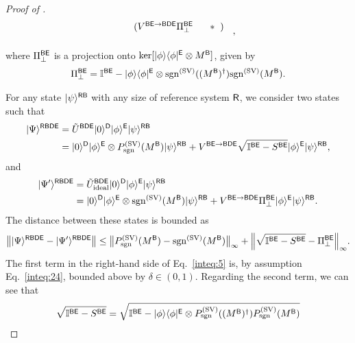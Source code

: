 \begin{proof}[Proof of ]
\begin{align}
\begin{blockarray}{ccc}
\begin{block}{c(cc)}
  &  V^{\sB\sE \rarr \sB\sD\sE}\Pi_\perp^{\sB\sE} &\hspace*{2mm} * \hspace*{2mm}\\
\end{block}
\end{blockarray}\hspace{2.5mm},
\end{align}
where $\Pi_\perp^{{\mathsf{B}}{\mathsf{E}}}$ is a projection onto $\ker[|\phi\rangle\langle\phi|^{\mathsf{E}}\otimes M^{\mathsf{B}}]$, given by 
\begin{align}
    \Pi_\perp^{{\mathsf{B}}{\mathsf{E}}} = \mathbb{I}^{{\mathsf{B}}{\mathsf{E}}} - |\phi\rangle\langle\phi|^{\mathsf{E}}\otimes \mathrm{sgn}^{(\rm SV)}((M^{\mathsf{B}})^\dag) \mathrm{sgn}^{(\rm SV)}(M^{\mathsf{B}}).
\end{align}

For any state $|\psi\rangle^{{\mathsf{R}}{\mathsf{B}}}$ with any size of reference system ${\mathsf{R}}$, we consider two states such that
\begin{align}
    |\Psi\rangle^{{\mathsf{R}}{\mathsf{B}}{\mathsf{D}}{\mathsf{E}}} 
    &= \tilde{U}^{{\mathsf{B}}{\mathsf{D}}{\mathsf{E}}}|0\rangle^{{\mathsf{D}}}|\phi\rangle^{\mathsf{E}}|\psi\rangle^{{\mathsf{R}}{\mathsf{B}}} \\
    &=|0\rangle^{{\mathsf{D}}}|\phi\rangle^{\mathsf{E}}\otimes P_{\mathrm{sgn}}^{(\rm SV)}(M^{\mathsf{B}})|\psi\rangle^{{\mathsf{R}}{\mathsf{B}}} 
    + V^{{\mathsf{B}}{\mathsf{E}} \rightarrow {\mathsf{B}}{\mathsf{D}}{\mathsf{E}}}\sqrt{\mathbb{I}^{{\mathsf{B}}{\mathsf{E}}} - S^{{\mathsf{B}}{\mathsf{E}}}}|\phi\rangle^{\mathsf{E}}|\psi\rangle^{{\mathsf{R}}{\mathsf{B}}},
\end{align}
and
\begin{align}
    |\Psi'\rangle^{{\mathsf{R}}{\mathsf{B}}{\mathsf{D}}{\mathsf{E}}} 
    &= \tilde{U}_{\rm ideal}^{{\mathsf{B}}{\mathsf{D}}{\mathsf{E}}}|0\rangle^{{\mathsf{D}}}|\phi\rangle^{\mathsf{E}}|\psi\rangle^{{\mathsf{R}}{\mathsf{B}}} \\
    &= |0\rangle^{{\mathsf{D}}}|\phi\rangle^{\mathsf{E}} \otimes \mathrm{sgn}^{(\rm SV)}(M^{\mathsf{B}})|\psi\rangle^{{\mathsf{R}}{\mathsf{B}}} 
    + V^{{\mathsf{B}}{\mathsf{E}} \rightarrow {\mathsf{B}}{\mathsf{D}}{\mathsf{E}}}\Pi_\perp^{{\mathsf{B}}{\mathsf{E}}}|\phi\rangle^{\mathsf{E}}|\psi\rangle^{{\mathsf{R}}{\mathsf{B}}}.
\end{align}
The distance between these states is bounded as
\begin{align}
\label{inteq:5}
    \big\||\Psi\rangle^{{\mathsf{R}}{\mathsf{B}}{\mathsf{D}}{\mathsf{E}}} - |\Psi'\rangle^{{\mathsf{R}}{\mathsf{B}}{\mathsf{D}}{\mathsf{E}}}\big\| 
    \leq \big\|P_{\mathrm{sgn}}^{(\rm SV)}(M^{\mathsf{B}}) - \mathrm{sgn}^{(\rm SV)}(M^{\mathsf{B}})\big\|_\infty
    + \Big\|\sqrt{\mathbb{I}^{{\mathsf{B}}{\mathsf{E}}} - S^{{\mathsf{B}}{\mathsf{E}}}} - \Pi_\perp^{{\mathsf{B}}{\mathsf{E}}}\Big\|_\infty.
\end{align}
The first term in the right-hand side of Eq.~\eqref{inteq:5} is, by assumption Eq.~\eqref{inteq:24}, bounded above by $\delta \in (0, 1)$. 
Regarding the second term, we can see that
\begin{align}
    \sqrt{\bI^{\sB\sE} - S^{\sB\sE}}
    &= \sqrt{\bI^{\sB\sE} - \ketbra{\phi}{\phi}^\sE\otimes P_\sgn^{(\rm SV)}((M^\sB)^\dag)P_\sgn^{(\rm SV)}(M^\sB)} \\

\end{align}
\end{proof}
